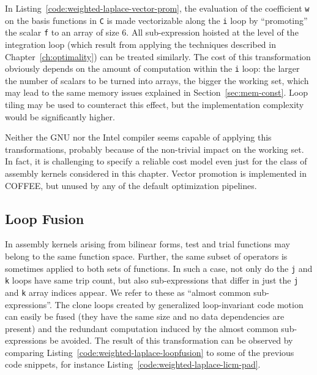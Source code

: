 In Listing~\ref{code:weighted-laplace-vector-prom}, the evaluation of the coefficient \texttt{w} on the basis functions in {\tt C} is made vectorizable along the {\tt i} loop by ``promoting'' the scalar \texttt{f} to an array of size 6. All sub-expression hoisted at the level of the integration loop (which result from applying the techniques described in Chapter~\ref{ch:optimality}) can be treated similarly. The cost of this transformation obviously depends on the amount of computation within the {\tt i} loop: the larger the number of scalars to be turned into arrays, the bigger the working set, which may lead to the same memory issues explained in Section~\ref{sec:mem-const}. Loop tiling may be used to counteract this effect, but the implementation complexity would be significantly higher. 

Neither the GNU nor the Intel compiler seems capable of applying this transformations, probably because of the non-trivial impact on the working set. In fact, it is challenging to specify a reliable cost model even just for the class of assembly kernels considered in this chapter. Vector promotion is implemented in COFFEE, but unused by any of the default optimization pipelines. 

\subsection{Loop Fusion}
\label{sec:coffee-loopfusion}

In assembly kernels arising from bilinear forms, test and trial functions may belong to the same function space. Further, the same subset of operators is sometimes applied to both sets of functions. In such a case, not only do the {\tt j} and {\tt k} loops have same trip count, but also sub-expressions that differ in just the {\tt j} and {\tt k} array indices appear. We refer to these as ``almost common sub-expressions''. The clone loops created by generalized loop-invariant code motion can easily be fused (they have the same size and no data dependencies  are present) and the redundant computation induced by the almost common sub-expressions be avoided. The result of this transformation can be observed by comparing Listing~\ref{code:weighted-laplace-loopfusion} to some of the previous code snippets, for instance Listing~\ref{code:weighted-laplace-licm-pad}.

